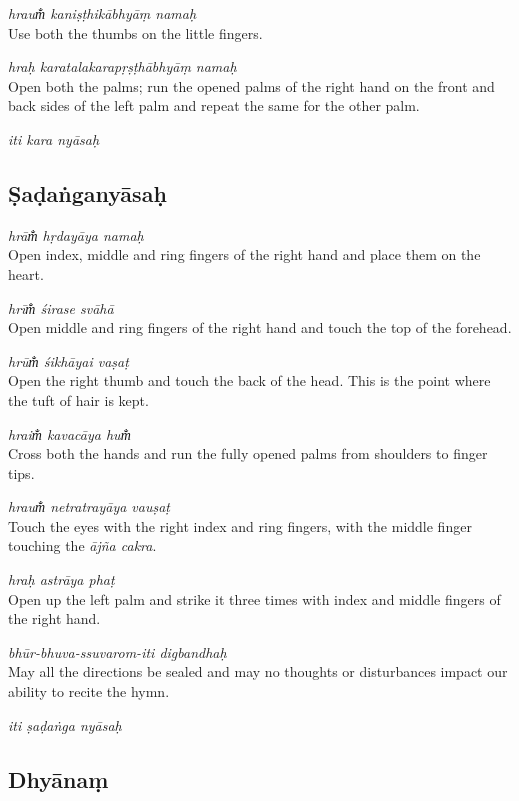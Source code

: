 \documentclass[12pt,oneside,a4paper]{article}
\newenvironment{shloka}[1]
  {\bigskip\center#1\varwidth{\linewidth}}
  {\endvarwidth\endcenter\bigskip}
\newcommand{\tl}[1]{\emph{#1}}
\begin{document}
\tl{hraum̐ kaniṣṭhikābhyāṃ namaḥ}\\
Use both the thumbs on the little fingers.

\tl{hraḥ karatalakarapṛṣṭhābhyāṃ namaḥ}\\
Open both the palms; run the opened palms of the right hand on the front and
back sides of the left palm and repeat the same for the other palm.

\begin{shloka}\itshape
  iti kara nyāsaḥ
\end{shloka}

\subsection{Ṣaḍaṅganyāsaḥ}

\tl{hrām̐ hṛdayāya namaḥ}\\
Open index, middle and ring fingers of the right hand and place them on
the heart.

\tl{hrīm̐ śirase svāhā}\\
Open middle and ring fingers of the right hand and touch the top of the forehead.

\tl{hrūm̐ śikhāyai vaṣaṭ}\\
Open the right thumb and touch the back of the head. This is the point where
the tuft of hair is kept.

\tl{hraim̐ kavacāya hum̐}\\
Cross both the hands and run the fully opened palms from shoulders to
finger tips.

\tl{hraum̐ netratrayāya vauṣaṭ}\\
Touch the eyes with the right index and ring fingers, with the middle finger
touching the \tl{ājña cakra}.

\tl{hraḥ astrāya phaṭ}\\
Open up the left palm and strike it three times with index and middle fingers
of the right hand.

\tl{bhūr-bhuva-ssuvarom-iti digbandhaḥ}\\
May all the directions be sealed and may no thoughts or disturbances impact our
ability to recite the hymn.

\begin{shloka}\itshape
  iti ṣaḍaṅga nyāsaḥ
\end{shloka}

\subsection{Dhyānaṃ}
\end{document}
